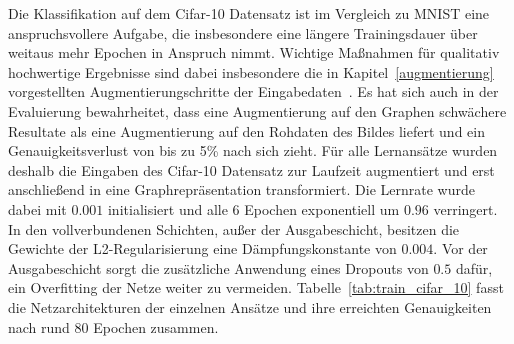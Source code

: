 Die Klassifikation auf dem \gls{Cifar}-10 Datensatz ist im Vergleich zu \gls{MNIST} eine anspruchsvollere Aufgabe, die insbesondere eine längere Trainingsdauer über weitaus mehr Epochen in Anspruch nimmt.
Wichtige Maßnahmen für qualitativ hochwertige Ergebnisse sind dabei insbesondere die in Kapitel~\ref{augmentierung} vorgestellten Augmentierungschritte der Eingabedaten~\cite{tensorflow}.
Es hat sich auch in der Evaluierung bewahrheitet, dass eine Augmentierung auf den Graphen schwächere Resultate als eine Augmentierung auf den Rohdaten des Bildes liefert und ein Genauigkeitsverlust von bis zu 5\% nach sich zieht.
Für alle Lernansätze wurden deshalb die Eingaben des \gls{Cifar}-10 Datensatz zur Laufzeit augmentiert und erst anschließend in eine Graph\-re\-prä\-sen\-ta\-tion transformiert.
Die Lernrate wurde dabei mit $0.001$ initialisiert und alle 6 Epochen exponentiell um $0.96$ verringert.
In den vollverbundenen Schichten, außer der Ausgabeschicht, besitzen die Gewichte \bzgl{} der L2-Regularisierung eine Dämpfungskonstante von $0.004$.
Vor der Ausgabeschicht sorgt die zusätzliche Anwendung eines Dropouts von $0.5$ dafür, ein Overfitting der Netze weiter zu vermeiden.
Tabelle~\ref{tab:train_cifar_10} fasst die Netzarchitekturen der einzelnen Ansätze und ihre erreichten Genauigkeiten nach rund 80 Epochen zusammen.
\begin{table}[t]
\centering
{}
\caption[Testgenauigkeiten der \gls{Cifar}-10 Superpixelrepräsentationen]{Testgenauigkeiten eines Trainings auf den durch \gls{SLIC} und Quickshift zur Laufzeit generierten Graphrepräsentationen des \gls{Cifar}-10 Datensatz nach 80 Epochen im Vergleich zu einer ähnlichen klassischen Netzarchitektur auf den Bildrohdaten.}
\label{tab:train_cifar_10}
\end{table}
